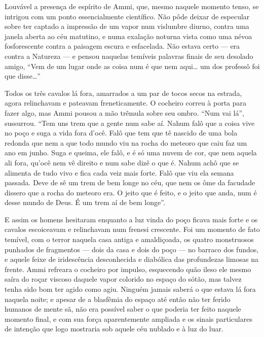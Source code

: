 Louvável a presença de espírito de Ammi, que, mesmo naquele momento
tenso, se intrigou com um ponto essencialmente científico. Não pôde
deixar de especular sobre ter captado a impressão de um vapor num
vislumbre diurno, contra uma janela aberta ao céu matutino, e numa
exalação noturna vista como uma névoa fosforescente contra a paisagem
escura e esfacelada. Não estava certo --- era contra a Natureza --- e
pensou naquelas temíveis palavras finais de seu desolado amigo, ``Vem de
um lugar onde as coisa num é que nem aqui\ldots{} um dos professô foi que
disse\ldots{}''

Todos os três cavalos lá fora, amarrados a um par de tocos secos na
estrada, agora relinchavam e pateavam freneticamente. O cocheiro correu
à porta para fazer algo, mas Ammi pousou a mão trêmula sobre seu ombro.
``Num vai lá'', sussurrou. ``Tem uns trem que a gente num sabe aí. Nahum
falô que a coisa vive no poço e suga a vida fora d'ocê. Falô que tem que
tê nascido de uma bola redonda que nem a que todo mundo viu na rocha do
meteoro que caiu faz um ano em junho. Suga e queima, ele falô, e é só
uma nuvem de cor, que nem aquela ali fora, qu'ocê nem vê direito e num
sabe dizê o que é. Nahum achô que se alimenta de tudo vivo e fica cada
veiz mais forte. Falô que viu ela semana passada. Deve de sê um trem de
bem longe no céu, que nem os ôme da facudade dissero que a rocha do
meteoro era. O jeito que é feito, e o jeito que anda, num é desse mundo
de Deus. É um trem aí de bem longe''.

E assim os homens hesitaram enquanto a luz vinda do poço ficava mais
forte e os cavalos escoiceavam e relinchavam num frenesi crescente. Foi
um momento de fato temível, com o terror naquela casa antiga e
amaldiçoada, os quatro monstruosos punhados de fragmentos --- dois da
casa e dois do poço --- no barraco dos fundos, e aquele feixe de
iridescência desconhecida e diabólica das profundezas limosas na frente.
Ammi refreara o cocheiro por impulso, esquecendo quão ileso ele mesmo
saíra do roçar viscoso daquele vapor colorido no espaço do sótão, mas
talvez tenha sido bom ter agido como agiu. Ninguém jamais saberá o que
estava lá fora naquela noite; e apesar de a blasfêmia do espaço até
então não ter ferido humanos de mente sã, não era possível saber o que
poderia ter feito naquele momento final, e com sua força aparentemente
ampliada e os sinais particulares de intenção que logo mostraria sob
aquele céu nublado e à luz do luar.

